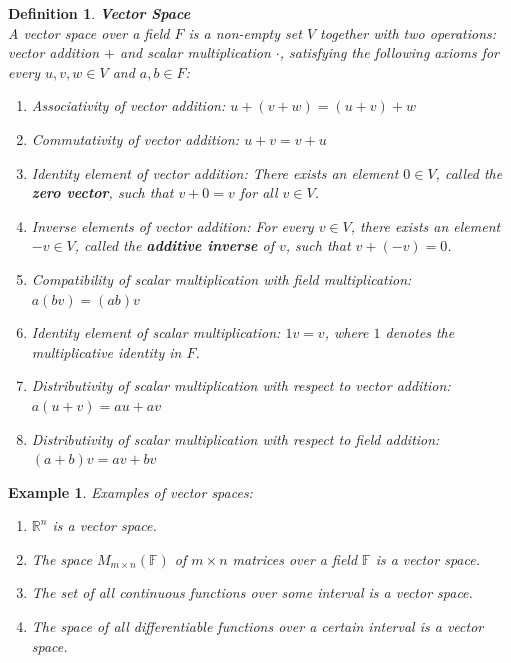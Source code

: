 \documentclass[11pt]{book} %
\newtheorem{definition}{Definition}[section]
\newtheorem*{example*}{Example}
\begin{document}
\begin{definition}{\textbf{Vector Space}} \\
    A vector space over a field \( F \) is a non-empty set \( V \) together with two operations: vector addition \( + \) and scalar multiplication \( \cdot \), satisfying the following axioms for every \( u, v, w \in V \) and \( a, b \in F \):
    \begin{enumerate}
        \item Associativity of vector addition: \( u + (v + w) = (u + v) + w \)
        \item Commutativity of vector addition: \( u + v = v + u \)
        \item Identity element of vector addition: There exists an element \( 0 \in V \), called the \textbf{zero vector}, such that \( v + 0 = v \) for all \( v \in V \).
        \item Inverse elements of vector addition: For every \( v \in V \), there exists an element \( -v \in V \), called the \textbf{additive inverse} of \( v \), such that \( v + (-v) = 0 \).
        \item Compatibility of scalar multiplication with field multiplication: \( a(bv) = (ab)v \)
        \item Identity element of scalar multiplication: \( 1v = v \), where \( 1 \) denotes the multiplicative identity in \( F \).
        \item Distributivity of scalar multiplication with respect to vector addition: \( a(u + v) = au + av \)
        \item Distributivity of scalar multiplication with respect to field addition: \( (a + b)v = av + bv \)
    \end{enumerate}
\end{definition}

\begin{example*}
Examples of vector spaces:
\begin{enumerate}
\item \( \mathbb{R}^n \) is a vector space.
\item The space \( M_{m \times n}(\mathbb{F}) \) of \( m \times n \) matrices over a field \(\mathbb{F}\) is a vector space.
\item The set of all continuous functions over some interval is a vector space.
\item The space of all differentiable functions over a certain interval is a vector space.
\end{enumerate}
\end{example*}
\end{document}
